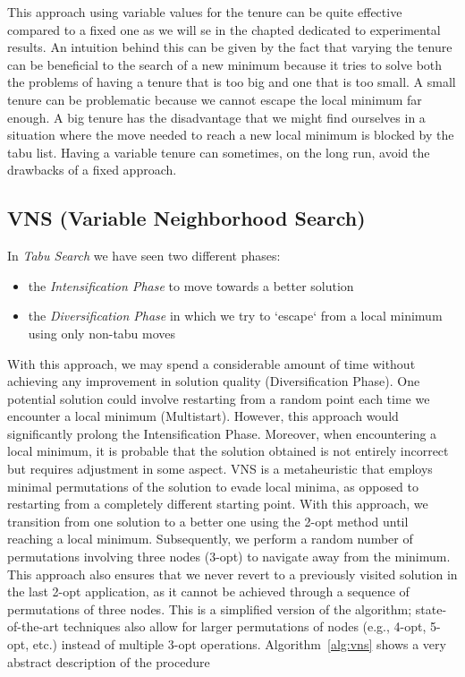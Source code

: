 \documentclass{article}
\begin{document}
This approach using variable values for the tenure can be quite effective compared to a fixed one as we will se in the chapted dedicated to experimental results.
An intuition behind this can be given by the fact that varying the tenure can be beneficial to the search of a new minimum because it tries to solve both the problems of having a tenure that is too big and one that is too small.
A small tenure can be problematic because we cannot escape the local minimum far enough. A big tenure has the disadvantage that we might find ourselves in a situation where the move needed to reach a new local minimum is blocked by the
tabu list. Having a variable tenure can sometimes, on the long run, avoid the drawbacks of a fixed approach.

\subsection{VNS (Variable Neighborhood Search)}
In \textit{Tabu Search} we have seen two different phases: 
\begin{itemize}
	\item the \textit{Intensification Phase} to move towards a better solution
	\item the \textit{Diversification Phase} in which we try to `escape` from a local minimum using only
	non-tabu moves
\end{itemize}
With this approach, we may spend a considerable amount of time without achieving any improvement in 
solution quality (Diversification Phase). One potential solution could involve restarting from a random 
point each time we encounter a local minimum (Multistart). However, this approach would significantly 
prolong the Intensification Phase. Moreover, when encountering a local minimum, it is probable 
that the solution obtained is not entirely incorrect but requires adjustment in some aspect.
VNS is a metaheuristic that employs minimal permutations of the solution to evade local minima, as 
opposed to restarting from a completely different starting point.
With this approach, we transition from one solution to a better one using the 2-opt method until reaching 
a local minimum. Subsequently, we perform a random number of permutations involving three nodes (3-opt)
to navigate away from the minimum. This approach also ensures that we never revert to a previously visited
solution in the last 2-opt application, as it cannot be achieved through a sequence of permutations of
three nodes.
This is a simplified version of the algorithm; state-of-the-art techniques also allow for larger permutations
of nodes (e.g., 4-opt, 5-opt, etc.) instead of multiple 3-opt operations.
Algorithm~\ref{alg:vns} shows a very abstract description of the procedure
\end{document}
